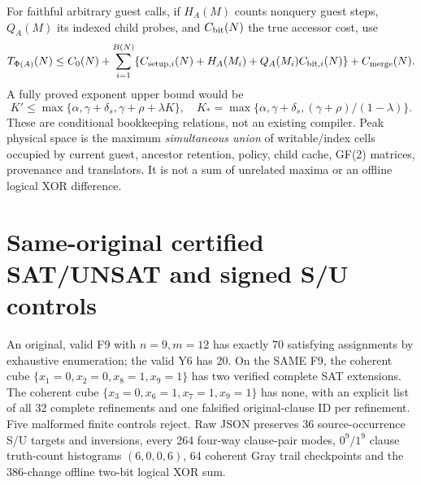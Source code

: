 \documentclass[11pt]{article}
\begin{document}
For faithful arbitrary guest calls, if $H_A(M)$ counts nonquery guest steps, $Q_A(M)$ its indexed child probes, and $C_{\rm bit}(N)$ the true accessor cost, use
\[
T_{\Phi(A)}(N)\le C_0(N)+
\sum_{i=1}^{B(N)}
\{C_{{\rm setup},i}(N)+H_A(M_i)+Q_A(M_i)C_{{\rm bit},i}(N)\}+C_{\rm merge}(N).
\]
A fully proved exponent upper bound would be
\[
K'\le\max\{\alpha,\gamma+\delta_s,\gamma+\rho+\lambda K\},
\quad K_*=\max\{\alpha,\gamma+\delta_s,(\gamma+\rho)/(1-\lambda)\}.
\]
These are conditional bookkeeping relations, not an existing compiler. Peak physical space is the maximum \emph{simultaneous union} of writable/index cells occupied by current guest, ancestor retention, policy, child cache, GF(2) matrices, provenance and translators. It is not a sum of unrelated maxima or an offline logical XOR difference.

\section{Same-original certified SAT/UNSAT and signed S/U controls}
An original, valid F9 with $n=9,m=12$ has exactly 70 satisfying assignments by exhaustive enumeration; the valid Y6 has 20. On the SAME F9, the coherent cube $\{x_1=0,x_2=0,x_8=1,x_9=1\}$ has two verified complete SAT extensions. The coherent cube $\{x_3=0,x_6=1,x_7=1,x_9=1\}$ has none, with an explicit list of all 32 complete refinements and one falsified original-clause ID per refinement. Five malformed finite controls reject. Raw JSON preserves 36 source-occurrence S/U targets and inversions, every 264 four-way clause-pair modes, $0^9/1^9$ clause truth-count histograms $(6,0,0,6)$, 64 coherent Gray trail checkpoints and the 386-change offline two-bit logical XOR sum.
\end{document}
